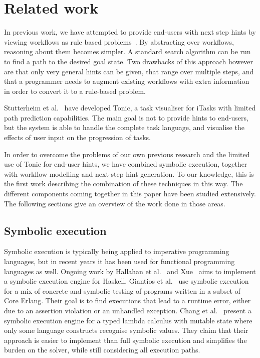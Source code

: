 
\section{Related work}
\label{sec:relatedwork}

In previous work, we have attempted to provide end-users with next step hints by viewing workflows as rule based problems~\cite{DBLP:conf/sfp/NausJ16}.
By abstracting over workflows, reasoning about them becomes simpler.
A standard search algorithm can be run to find a path to the desired goal state.
Two drawbacks of this approach however are that only very general hints can be given, that range over multiple steps, and that a programmer needs to augment existing workflows with extra information in order to convert it to a rule-based problem.

Stutterheim et al.~\cite{DBLP:conf/sfp/StutterheimPA14} have developed Tonic, a task visualiser for iTasks with limited path prediction capabilities.
The main goal is not to provide hints to end-users, but the system is able to handle the complete task language, and visualise the effects of user input on the progression of tasks.

In order to overcome the problems of our own previous research and the limited use of Tonic for end-user hints, we have combined symbolic execution, together with workflow modelling and next-step hint generation.
To our knowledge, this is the first work describing the combination of these techniques in this way.
The different components coming together in this paper have been studied extensively.
The following sections give an overview of the work done in those areas.

\subsection{Symbolic execution}


Symbolic execution \cite{King1975,Boyer1975} is typically being applied to imperative programming languages,
but in recent years it has been used for functional programming languages as well.
Ongoing work by Hallahan et al.~\cite{HallahanXP2017} and Xue~\cite{Xue2019} aims to implement a symbolic execution engine for Haskell.
Giantios et al.~\cite{GiantsiosPS2017} use symbolic execution for a mix of concrete and symbolic testing of programs written in a subset of Core Erlang.
Their goal is to find executions that lead to a runtime error, either due to an assertion violation or an unhandled exception.
Chang et al.~\cite{ChangKT2018} present a symbolic execution engine for a typed lambda calculus with mutable state where only some language constructs recognise symbolic values.
They claim that their approach is easier to implement than full symbolic execution and simplifies the burden on the solver, while still considering all execution paths.

